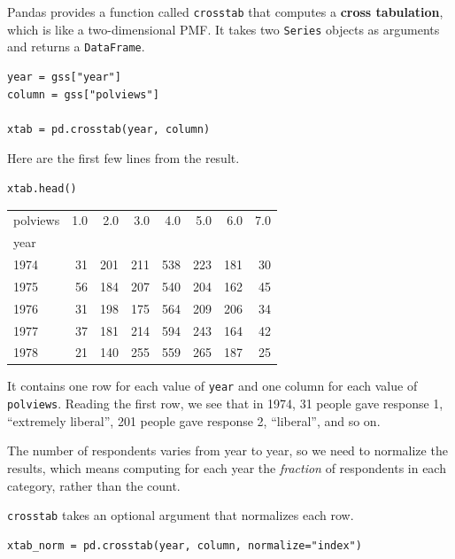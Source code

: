 Pandas provides a function called \passthrough{\lstinline!crosstab!}
that computes a \textbf{cross tabulation}, which is like a
two-dimensional PMF. It takes two \passthrough{\lstinline!Series!}
objects as arguments and returns a \passthrough{\lstinline!DataFrame!}.

\begin{lstlisting}[]
year = gss["year"]
column = gss["polviews"]

xtab = pd.crosstab(year, column)
\end{lstlisting}

Here are the first few lines from the result.

\begin{lstlisting}[]
xtab.head()
\end{lstlisting}

\begin{tabular}{lrrrrrrr}
\midrule
polviews &  1.0 &  2.0 &  3.0 &  4.0 &  5.0 &  6.0 &  7.0 \\
year &      &      &      &      &      &      &      \\
\midrule
1974 &   31 &  201 &  211 &  538 &  223 &  181 &   30 \\
1975 &   56 &  184 &  207 &  540 &  204 &  162 &   45 \\
1976 &   31 &  198 &  175 &  564 &  209 &  206 &   34 \\
1977 &   37 &  181 &  214 &  594 &  243 &  164 &   42 \\
1978 &   21 &  140 &  255 &  559 &  265 &  187 &   25 \\
\midrule
\end{tabular}

It contains one row for each value of \passthrough{\lstinline!year!} and
one column for each value of \passthrough{\lstinline!polviews!}. Reading
the first row, we see that in 1974, 31 people gave response 1,
``extremely liberal'', 201 people gave response 2, ``liberal'', and so
on.

The number of respondents varies from year to year, so we need to
normalize the results, which means computing for each year the
\emph{fraction} of respondents in each category, rather than the count.

\passthrough{\lstinline!crosstab!} takes an optional argument that
normalizes each row.

\begin{lstlisting}[]
xtab_norm = pd.crosstab(year, column, normalize="index")
\end{lstlisting}

